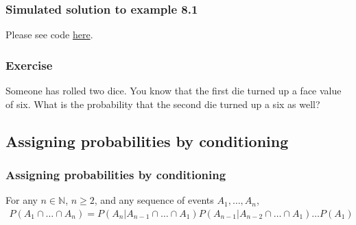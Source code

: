 \begin{frame}[fragile]
    \frametitle{Simulated solution to example 8.1}

    Please see code \href{https://joacorapela.github.io/gcnuBridging2023/auto_examples/foundations/plot_example8_1.html#sphx-glr-auto-examples-foundations-plot-example8-1-py}{here}.

\end{frame}

\begin{frame}
    \frametitle{Exercise}

    Someone has rolled two dice. You know that the first die turned up a
face value of six. What is the probability that the second die turned up a six
as  well?

\end{frame}

\subsection{Assigning probabilities by conditioning}

\begin{frame}
    \frametitle{Assigning probabilities by conditioning}

    \scriptsize
    \begin{probRule}

        For any $n\in\mathbb{N}$, $n\ge 2$, and any sequence of events $A_1,\ldots,A_n$,
            \begin{align*}
                P(A_1\cap\ldots\cap A_n) = P(A_n|A_{n-1}\cap\ldots\cap A_1)
                P(A_{n-1}|A_{n-2}\cap\ldots\cap A_1)\ldots P(A_1)
            \end{align*}
    \end{probRule}

\end{frame}

